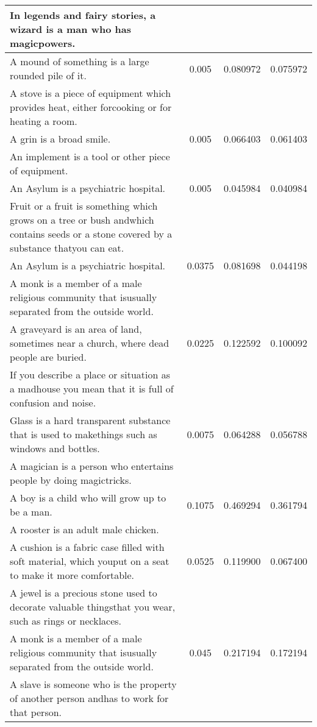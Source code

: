 \begin{center}
{\begin{longtable}{|p{9cm}|c|c|c|}
In legends and fairy stories, a wizard is a man who has magicpowers. & & & \\
\hline
A mound of something is a large rounded pile of it. & 0.005 & 0.080972 & 0.075972 \\
A stove is a piece of equipment which provides heat, either forcooking or for heating a room. & & & \\
\hline
A grin is a broad smile. & 0.005 & 0.066403 & 0.061403 \\
An implement is a tool or other piece of equipment. & & & \\
\hline
An Asylum is a psychiatric hospital. & 0.005 & 0.045984 & 0.040984 \\
Fruit or a fruit is something which grows on a tree or bush andwhich contains seeds or a stone covered by a substance thatyou can eat. & & & \\
\hline
An Asylum is a psychiatric hospital. & 0.0375 & 0.081698 & 0.044198 \\
A monk is a member of a male religious community that isusually separated from the outside world. & & & \\
\hline
A graveyard is an area of land, sometimes near a church, where dead people are buried. & 0.0225 & 0.122592 & 0.100092 \\
If you describe a place or situation as a madhouse you mean                                                                             that it is full of confusion and noise. & & & \\
\hline
Glass is a hard transparent substance that is used to makethings such as windows and bottles. & 0.0075 & 0.064288 & 0.056788 \\
A magician is a person who entertains people by doing magictricks. & & & \\
\hline
A boy is a child who will grow up to be a man. & 0.1075 & 0.469294 & 0.361794 \\
A rooster is an adult male chicken. & & & \\
\hline
A cushion is a fabric case filled with soft material, which youput on a seat to make it more comfortable. & 0.0525 & 0.119900 & 0.067400 \\
A jewel is a precious stone used to decorate valuable thingsthat you wear, such as rings or necklaces. & & & \\
\hline
A monk is a member of a male religious community that isusually separated from the outside world. & 0.045 & 0.217194 & 0.172194 \\
A slave is someone who is the property of another person andhas to work for that person. & & & \\

\end{longtable}}
\end{center}
